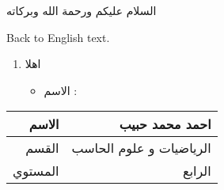 \documentclass{article}
\begin{document}
السلام عليكم ورحمة الله وبركاته


Back to English text.

\begin{enumerate}
    \item اهلا 
    \begin{itemize}
        \item الاسم : 
    \end{itemize} 
\end{enumerate}

\begin{tabular}{|r | r|}
    \hline
    الاسم   & احمد محمد حبيب      \\
    \hline
    القسم   & الرياضيات و علوم الحاسب      \\
    \hline
    المستوي   & الرابع      \\
    \hline
\end{tabular}
\end{document}
